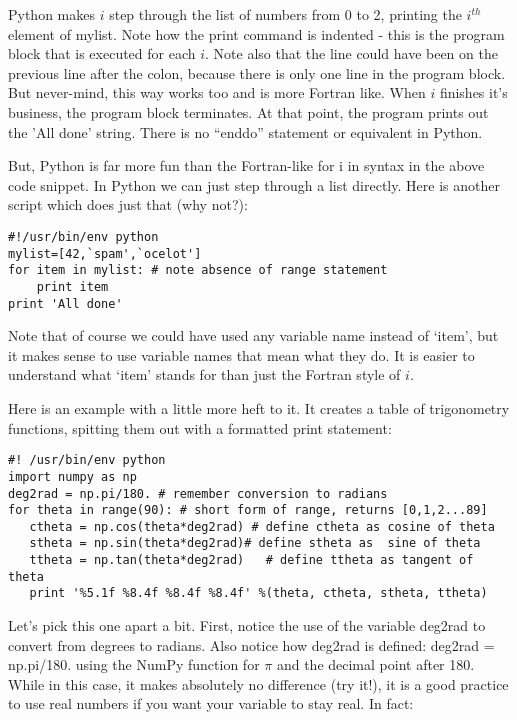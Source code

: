 {   Python makes $i$ step through the list of numbers from 0 to 2, printing the $i^{th}$ element of {\color{blue}mylist}.  Note how the print command is indented - this is the program block that is executed for each $i$.   Note also that the line could have been on the previous line after the colon, because there is only one line in the program block.  But never-mind, this way works too and is more Fortran like.   When $i$ finishes it's business, the program block terminates.   At that point, the program prints out the 'All done' string.   There is no ``enddo'' statement or equivalent in Python.  

But, Python is far more fun than the Fortran-like {\color{blue}for i in} syntax in the above code snippet.  In Python we can just step through a list directly.  Here is another  script which does just that (why not?):  

{\singlespacing \color{blue} \begin{verbatim}
#!/usr/bin/env python
mylist=[42,`spam',`ocelot']
for item in mylist: # note absence of range statement
    print item
print 'All done' 
\end{verbatim}}

\noindent Note that of course we could have used any variable name instead of `item', but it makes sense to use variable names that mean what they do.  It is easier to understand what `item' stands for than just the Fortran style of $i$.  

Here is an example with a little more heft to it.  It creates a table of trigonometry functions, spitting them out with a formatted print statement:

{\singlespacing \color{blue} \begin{verbatim}
#! /usr/bin/env python
import numpy as np
deg2rad = np.pi/180. # remember conversion to radians
for theta in range(90): # short form of range, returns [0,1,2...89]
   ctheta = np.cos(theta*deg2rad) # define ctheta as cosine of theta
   stheta = np.sin(theta*deg2rad)# define stheta as  sine of theta
   ttheta = np.tan(theta*deg2rad)   # define ttheta as tangent of theta
   print '%5.1f %8.4f %8.4f %8.4f' %(theta, ctheta, stheta, ttheta) 
 \end{verbatim}}
 
 Let's pick this one apart a bit.  First, 
notice the use of the variable {\color{blue}deg2rad} to convert from degrees to radians.  Also notice how deg2rad is defined: {\color{blue}deg2rad = np.pi/180.} using the {\color{blue}NumPy} function for $\pi$ and the decimal point after 180.  While in this case, it makes absolutely no difference (try it!), it is a good practice to use real numbers if you want your variable to stay real.  In fact:

}
